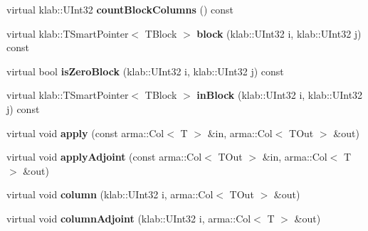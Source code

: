 \begin{DoxyCompactItemize}
\item 
virtual klab\+::\+U\+Int32 {\bfseries count\+Block\+Columns} () const \hypertarget{classkl1p_1_1TAdjointBlockOperator_ae93a962d58a0af39712acda072e048ac}{}\label{classkl1p_1_1TAdjointBlockOperator_ae93a962d58a0af39712acda072e048ac}

\item 
virtual klab\+::\+T\+Smart\+Pointer$<$ T\+Block $>$ {\bfseries block} (klab\+::\+U\+Int32 i, klab\+::\+U\+Int32 j) const \hypertarget{classkl1p_1_1TAdjointBlockOperator_afd0d7a1b84b1f7296a406ce47bd02909}{}\label{classkl1p_1_1TAdjointBlockOperator_afd0d7a1b84b1f7296a406ce47bd02909}

\item 
virtual bool {\bfseries is\+Zero\+Block} (klab\+::\+U\+Int32 i, klab\+::\+U\+Int32 j) const \hypertarget{classkl1p_1_1TAdjointBlockOperator_aa9c6f62a664a5bdfcde67485d8f9bec2}{}\label{classkl1p_1_1TAdjointBlockOperator_aa9c6f62a664a5bdfcde67485d8f9bec2}

\item 
virtual klab\+::\+T\+Smart\+Pointer$<$ T\+Block $>$ {\bfseries in\+Block} (klab\+::\+U\+Int32 i, klab\+::\+U\+Int32 j) const \hypertarget{classkl1p_1_1TAdjointBlockOperator_a7a1661f7e9abaabd5e5223cecd9754fd}{}\label{classkl1p_1_1TAdjointBlockOperator_a7a1661f7e9abaabd5e5223cecd9754fd}

\item 
virtual void {\bfseries apply} (const arma\+::\+Col$<$ T $>$ \&in, arma\+::\+Col$<$ T\+Out $>$ \&out)\hypertarget{classkl1p_1_1TAdjointBlockOperator_ac6013539ab0af0af5fb3620f998417ed}{}\label{classkl1p_1_1TAdjointBlockOperator_ac6013539ab0af0af5fb3620f998417ed}

\item 
virtual void {\bfseries apply\+Adjoint} (const arma\+::\+Col$<$ T\+Out $>$ \&in, arma\+::\+Col$<$ T $>$ \&out)\hypertarget{classkl1p_1_1TAdjointBlockOperator_adf8456be199079565f31d0c1ba0d3736}{}\label{classkl1p_1_1TAdjointBlockOperator_adf8456be199079565f31d0c1ba0d3736}

\item 
virtual void {\bfseries column} (klab\+::\+U\+Int32 i, arma\+::\+Col$<$ T\+Out $>$ \&out)\hypertarget{classkl1p_1_1TAdjointBlockOperator_a68e3e719ebdb36388ad9f021af11987e}{}\label{classkl1p_1_1TAdjointBlockOperator_a68e3e719ebdb36388ad9f021af11987e}

\item 
virtual void {\bfseries column\+Adjoint} (klab\+::\+U\+Int32 i, arma\+::\+Col$<$ T $>$ \&out)\hypertarget{classkl1p_1_1TAdjointBlockOperator_ab23a40c5eabcb4211975516c3a27ac74}{}\label{classkl1p_1_1TAdjointBlockOperator_ab23a40c5eabcb4211975516c3a27ac74}


\end{DoxyCompactItemize}

